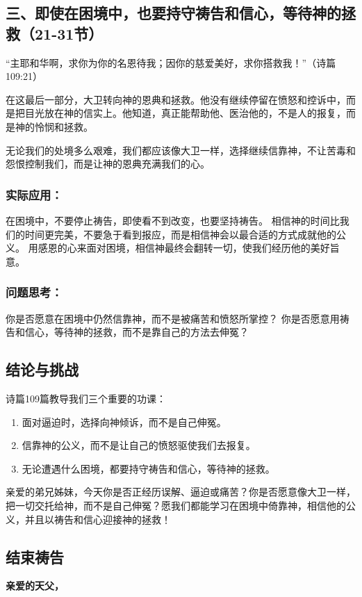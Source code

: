 \documentclass[a4paper, 12pt]{article}
\begin{document}
\subsection*{三、即使在困境中，也要持守祷告和信心，等待神的拯救（21-31节）}
“主耶和华啊，求你为你的名恩待我；因你的慈爱美好，求你搭救我！”（诗篇109:21）

在这最后一部分，大卫转向神的恩典和拯救。他没有继续停留在愤怒和控诉中，而是把目光放在神的信实上。他知道，真正能帮助他、医治他的，不是人的报复，而是神的怜悯和拯救。

无论我们的处境多么艰难，我们都应该像大卫一样，选择继续信靠神，不让苦毒和怨恨控制我们，而是让神的恩典充满我们的心。

\subsubsection*{实际应用：}

在困境中，不要停止祷告，即使看不到改变，也要坚持祷告。
相信神的时间比我们的时间更完美，不要急于看到报应，而是相信神会以最合适的方式成就他的公义。
用感恩的心来面对困境，相信神最终会翻转一切，使我们经历他的美好旨意。
\subsubsection*{问题思考：}

你是否愿意在困境中仍然信靠神，而不是被痛苦和愤怒所掌控？
你是否愿意用祷告和信心，等待神的拯救，而不是靠自己的方法去伸冤？
\subsection*{结论与挑战}
诗篇109篇教导我们三个重要的功课：
\begin{enumerate}
    \item 面对逼迫时，选择向神倾诉，而不是自己伸冤。

    \item 信靠神的公义，而不是让自己的愤怒驱使我们去报复。

    \item 无论遭遇什么困境，都要持守祷告和信心，等待神的拯救。

\end{enumerate}

亲爱的弟兄姊妹，今天你是否正经历误解、逼迫或痛苦？你是否愿意像大卫一样，把一切交托给神，而不是自己伸冤？愿我们都能学习在困境中倚靠神，相信他的公义，并且以祷告和信心迎接神的拯救！

\subsection*{结束祷告}
\textbf{亲爱的天父，}
\end{document}

